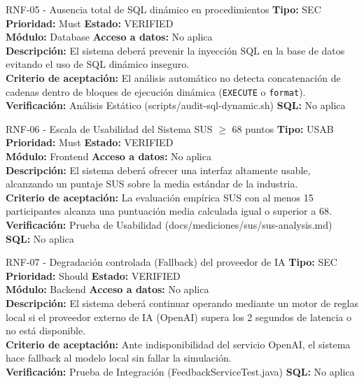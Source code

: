 \documentclass[11pt,a4paper]{article}
\begin{document}
\begin{requisito}{RNF-05 - Ausencia total de SQL dinámico en procedimientos}
    \textbf{Tipo:} SEC \quad \textbf{Prioridad:} Must \quad \textbf{Estado:} VERIFIED \\[0.2cm]
    \textbf{Módulo:} Database \quad \textbf{Acceso a datos:} No aplica \\[0.2cm]
    \textbf{Descripción:} El sistema deberá prevenir la inyección SQL en la base de datos evitando el uso de SQL dinámico inseguro. \\[0.2cm]
    \textbf{Criterio de aceptación:} El análisis automático no detecta concatenación de cadenas dentro de bloques de ejecución dinámica (\texttt{EXECUTE} o \texttt{format}). \\[0.2cm]
    \textbf{Verificación:} Análisis Estático (scripts/audit-sql-dynamic.sh) \quad \textbf{SQL:} No aplica
\end{requisito}

\begin{requisito}{RNF-06 - Escala de Usabilidad del Sistema SUS $\ge$ 68 puntos}
    \textbf{Tipo:} USAB \quad \textbf{Prioridad:} Must \quad \textbf{Estado:} VERIFIED \\[0.2cm]
    \textbf{Módulo:} Frontend \quad \textbf{Acceso a datos:} No aplica \\[0.2cm]
    \textbf{Descripción:} El sistema deberá ofrecer una interfaz altamente usable, alcanzando un puntaje SUS sobre la media estándar de la industria. \\[0.2cm]
    \textbf{Criterio de aceptación:} La evaluación empírica SUS con al menos 15 participantes alcanza una puntuación media calculada igual o superior a 68. \\[0.2cm]
    \textbf{Verificación:} Prueba de Usabilidad (docs/mediciones/sus/sus-analysis.md) \quad \textbf{SQL:} No aplica
\end{requisito}

\begin{requisito}{RNF-07 - Degradación controlada (Fallback) del proveedor de IA}
    \textbf{Tipo:} SEC \quad \textbf{Prioridad:} Should \quad \textbf{Estado:} VERIFIED \\[0.2cm]
    \textbf{Módulo:} Backend \quad \textbf{Acceso a datos:} No aplica \\[0.2cm]
    \textbf{Descripción:} El sistema deberá continuar operando mediante un motor de reglas local si el proveedor externo de IA (OpenAI) supera los 2 segundos de latencia o no está disponible. \\[0.2cm]
    \textbf{Criterio de aceptación:} Ante indisponibilidad del servicio OpenAI, el sistema hace fallback al modelo local sin fallar la simulación. \\[0.2cm]
    \textbf{Verificación:} Prueba de Integración (FeedbackServiceTest.java) \quad \textbf{SQL:} No aplica
\end{requisito}
\end{document}

